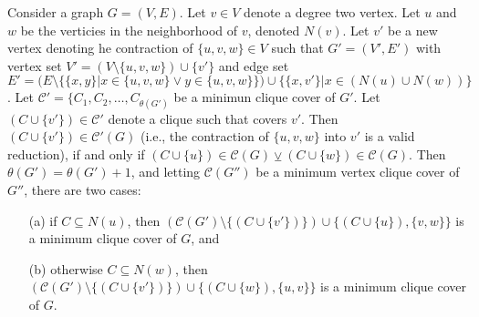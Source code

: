 \documentclass[../techreport.tex]{subfiles}
\begin{document}
\begin{lemma}
	Consider a graph $G = (V, E)$. Let $v \in V$ denote a degree two vertex. Let $u$ and $w$ be the verticies in the neighborhood of $v$, denoted $N(v)$. Let $v'$ be a new vertex denoting he contraction of $\{u, v, w\} \in V$ such that $G' = (V', E')$ with vertex set $V' = (V \setminus \{u, v, w\}) \cup \{v'\}$ and edge set $E' = (E \setminus \{\{x, y\}| x \in \{u, v, w\} \lor y \in \{u, v, w\}\}) \cup \{\{x, v'\}| x \in (N(u) \cup N(w))\}$. Let $\mathcal{C'} = \{C_1, C_2, \dots, C_{\theta(G')}$ be a minimun clique cover of $G'$. Let $(C \cup \{v'\}) \in \mathcal{C'}$ denote a clique such that covers $v'$. Then $(C \cup \{v'\}) \in \mathcal{C'}(G)$ (i.e., the contraction of $\{u, v, w\}$ into $v'$ is a valid reduction), if and only if $(C \cup \{u\}) \in \mathcal{C}(G) \veebar (C \cup \{w\}) \in \mathcal{C}(G)$. Then $\theta(G') = \theta(G') + 1$, and letting $\mathcal{C}(G'')$ be a minimum vertex clique cover of $G''$, there are two cases:
	\begin{itemize}
		\item[(a)] if $C \subseteq N(u)$, then $(\mathcal{C}(G') \setminus \{(C \cup \{v'\})\}) \cup \{(C \cup \{u\}), \{v, w\}\}$ is a minimum clique cover of $G$, and

		\item[(b)] otherwise $C \subseteq N(w)$, then $(\mathcal{C}(G') \setminus \{(C \cup \{v'\})\}) \cup \{(C \cup \{w\}), \{u, v\}\}$ is a minimum clique cover of $G$.
	\end{itemize}
\end{lemma}

\newtheorem{claim}{Claim}
\end{document}

